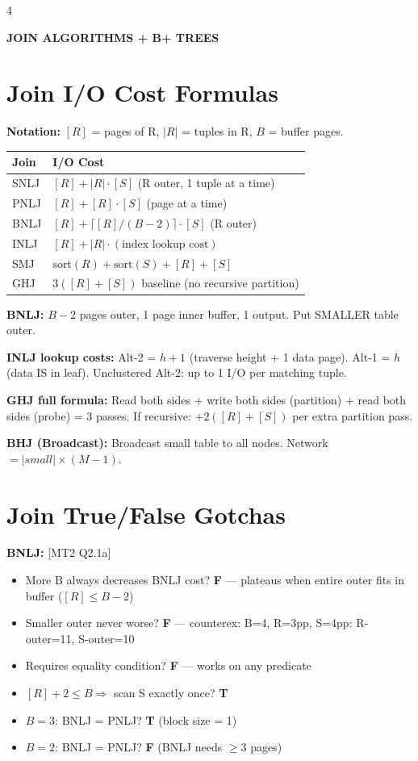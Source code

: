 \documentclass[8pt,letterpaper]{article}
\newcommand{\titlefont}{\fontsize{6.5}{7.5}\selectfont}
\newcommand{\codefont}{\fontsize{4.2}{4.8}\selectfont\ttfamily}
\newcommand{\key}[1]{\textbf{\color{red!70!black}#1}}
\newcommand{\ans}[1]{\textbf{\color{blue!80!black}#1}}
\newcommand{\qref}[1]{{\fontsize{3.5}{4}\selectfont\color{purple!60!black}[#1]}}
\begin{document}
\begin{multicols*}{4}
\centerline{\titlefont\textbf{\color{purple!80!black}JOIN ALGORITHMS + B+ TREES}}
\vspace{1pt}

\section{Join I/O Cost Formulas}
\key{Notation:} $[R]$ = pages of R, $|R|$ = tuples in R, $B$ = buffer pages.

{\codefont\begin{tabular}{@{}l|l@{}}
\textbf{Join} & \textbf{I/O Cost} \\
\hline
SNLJ & $[R] + |R|\cdot[S]$ (R outer, 1 tuple at a time)\\
PNLJ & $[R] + [R]\cdot[S]$ (page at a time)\\
BNLJ & $[R] + \lceil[R]/(B{-}2)\rceil\cdot[S]$ (R outer)\\
INLJ & $[R] + |R|\cdot(\text{index lookup cost})$\\
SMJ  & $\text{sort}(R) + \text{sort}(S) + [R] + [S]$\\
GHJ  & $3([R]+[S])$ baseline (no recursive partition)\\
\end{tabular}}

\key{BNLJ:} $B-2$ pages outer, 1 page inner buffer, 1 output. Put SMALLER table outer.

\key{INLJ lookup costs:} Alt-2 = $h+1$ (traverse height + 1 data page). Alt-1 = $h$ (data IS in leaf). Unclustered Alt-2: up to 1 I/O per matching tuple.

\key{GHJ full formula:} Read both sides + write both sides (partition) + read both sides (probe) = 3 passes. If recursive: $+2([R]+[S])$ per extra partition pass.

\key{BHJ (Broadcast):} Broadcast small table to all nodes. Network $=|small|\times(M-1)$.

\section{Join True/False Gotchas}
\key{BNLJ:} \qref{MT2 Q2.1a}
\begin{itemize}
  \item More B always decreases BNLJ cost? \ans{F} — plateaus when entire outer fits in buffer ($[R]\le B-2$)
  \item Smaller outer never worse? \ans{F} — counterex: B=4, R=3pp, S=4pp: R-outer=11, S-outer=10
  \item Requires equality condition? \ans{F} — works on any predicate
  \item $[R]+2\le B \Rightarrow$ scan S exactly once? \ans{T}
  \item $B=3$: BNLJ = PNLJ? \ans{T} (block size = 1)
  \item $B=2$: BNLJ = PNLJ? \ans{F} (BNLJ needs $\ge3$ pages)
\end{itemize}


\end{multicols*}
\end{document}
